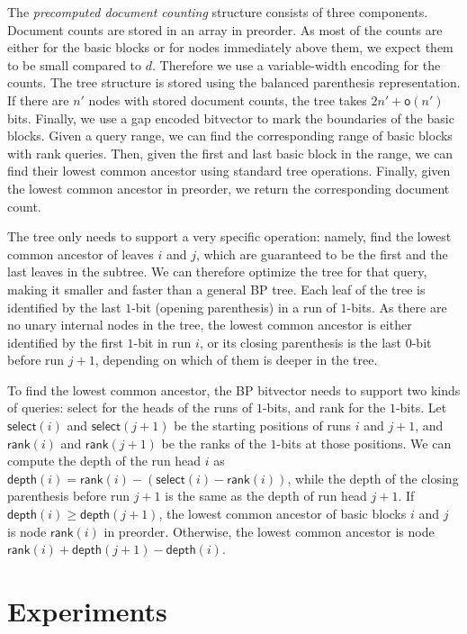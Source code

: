 \documentclass[11pt]{llncs}
\newcommand{\rank}{\textsf{rank}}
\newcommand{\select}{\textsf{select}}
\newcommand{\mrank}{\ensuremath{\mathsf{rank}}}
\newcommand{\mselect}{\ensuremath{\mathsf{select}}}
\newcommand{\mdepth}{\ensuremath{\mathsf{depth}}}
\newcommand{\oh}{\ensuremath{\mathsf{o}}}
\newcommand{\onebit}{$1$\nobreakdash-bit}
\newcommand{\zerobit}{$0$\nobreakdash-bit}
\begin{document}
The \emph{precomputed document counting} structure consists of three components. Document counts are stored in an array in preorder. As most of the counts are either for the basic blocks or for nodes immediately above them, we expect them to be small compared to $d$. Therefore we use a variable-width encoding for the counts. The tree structure is stored using the balanced parenthesis representation. If there are $n'$ nodes with stored document counts, the tree takes $2n' + \oh(n')$ bits. Finally, we use a gap encoded bitvector to mark the boundaries of the basic blocks. Given a query range, we can find the corresponding range of basic blocks with \rank{} queries. Then, given the first and last basic block in the range, we can find their lowest common ancestor using standard tree operations. Finally, given the lowest common ancestor in preorder, we return the corresponding document count.

The tree only needs to support a very specific operation: namely, find the lowest common ancestor of leaves $i$ and $j$, which are guaranteed to be the first and the last leaves in the subtree. We can therefore optimize the tree for that query, making it smaller and faster than a general BP tree. Each leaf of the tree is identified by the last \onebit{} (opening parenthesis) in a run of \onebit{}s. As there are no unary internal nodes in the tree, the lowest common ancestor is either identified by the first \onebit{} in run $i$, or its closing parenthesis is the last \zerobit{} before run $j+1$, depending on which of them is deeper in the tree.

To find the lowest common ancestor, the BP bitvector needs to support two kinds of queries: \select{} for the heads of the runs of \onebit{}s, and \rank{} for the \onebit{}s. Let $\mselect(i)$ and $\mselect(j+1)$ be the starting positions of runs $i$ and $j+1$, and $\mrank(i)$ and $\mrank(j+1)$ be the ranks of the \onebit{}s at those positions. We can compute the depth of the run head $i$ as $\mdepth(i) = \mrank(i) - (\mselect(i) - \mrank(i))$, while the depth of the closing parenthesis before run $j+1$ is the same as the depth of run head $j+1$. If $\mdepth(i) \ge \mdepth(j+1)$, the lowest common ancestor of basic blocks $i$ and $j$ is node $\mrank(i)$ in preorder. Otherwise, the lowest common ancestor is node $\mrank(i) + \mdepth(j+1) - \mdepth(i)$.


\section{Experiments}\label{section:experiments}
\end{document}

